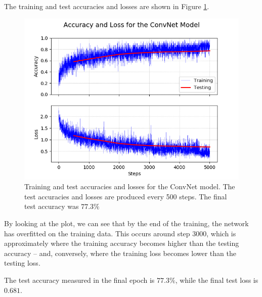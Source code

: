 \documentclass{article}
\begin{document}
The training and test accuracies and losses are shown in Figure \ref{fig:convnet_results}.

\begin{figure}[h]
    \centering
    \includegraphics[scale=0.7]{img/convnet_results.png}
    \caption{Training and test accuracies and losses for the ConvNet model. The test accuracies and losses are produced every 500 steps. The final test accuracy was $77.3\%$}
    \label{fig:convnet_results}
\end{figure}

By looking at the plot, we can see that by the end of the training, the network has overfitted on the training data. This occurs around step 3000, which is approximately where the training accuracy becomes higher than the testing accuracy -- and, conversely, where the training loss becomes lower than the testing loss.

The test accuracy measured in the final epoch is $77.3\%$, while the final test loss is $0.681$.
\end{document}
